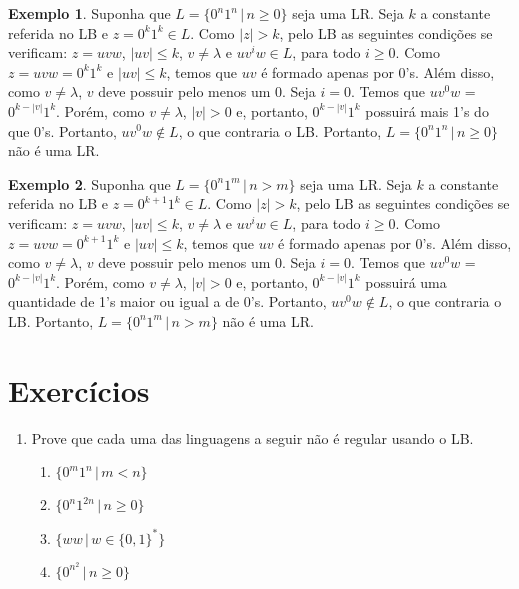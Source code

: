 \documentclass[a4paper]{article}
\theoremstyle{definition}
\newtheorem{Example}{Exemplo}
\begin{document}
  \begin{Example}
    Suponha que $L = \{0^n1^n\,|\,n\geq 0\}$ seja uma LR. Seja $k$ a constante
    referida no LB e $z = 0^k1^k \in L$. Como $|z| > k$, pelo LB as seguintes
    condições se verificam: $z = uvw$, $|uv| \leq k$, $v \neq \lambda$ e
    $uv^iw \in L$, para todo $i \geq 0$. Como $z = uvw = 0^k1^k$ e $|uv| \leq k$,
    temos que $uv$ é formado apenas por 0's. Além disso, como $v \neq \lambda$,
    $v$ deve possuir pelo menos um 0. Seja $i = 0$. Temos que $uv^0w$ = $0^{k -
      |v|}1^k$. Porém, como $v \neq \lambda$, $|v| > 0$ e, portanto,
    $0^{k -|v|}1^k$ possuirá mais 1's do que 0's. Portanto, $uv^0w \not\in L$, 
    o que contraria o LB. Portanto, $L = \{0^n1^n\,|\,n\geq 0\}$ não é uma LR.
  \end{Example}


  \begin{Example}
    Suponha que $L = \{0^n1^m\,|\,n > m\}$ seja uma LR. Seja $k$ a constante
    referida no LB e $z = 0^{k + 1}1^k \in L$. Como $|z| > k$, pelo LB as seguintes
    condições se verificam: $z = uvw$, $|uv| \leq k$, $v \neq \lambda$ e
    $uv^iw \in L$, para todo $i \geq 0$. Como $z = uvw = 0^{k+1}1^k$ e $|uv| \leq k$,
    temos que $uv$ é formado apenas por 0's. Além disso, como $v \neq \lambda$,
    $v$ deve possuir pelo menos um 0. Seja $i = 0$. Temos que $uv^0w$ = $0^{k -
      |v|}1^k$. Porém, como $v \neq \lambda$, $|v| > 0$ e, portanto,
    $0^{k -|v|}1^k$ possuirá uma quantidade de 1's maior ou igual a de 0's.
     Portanto, $uv^0w \not\in L$, 
     o que contraria o LB. Portanto, $L = \{0^n1^m\,|\,n > m\}$ não é uma LR.
  \end{Example}
  
  
  \section{Exercícios}

  \begin{enumerate}
    \item Prove que cada uma das linguagens a seguir não é regular usando o LB.
      \begin{enumerate}
        \item $\{0^m1^n\,|\,m < n\}$
        \item $\{0^n1^{2n}\,|\,n\geq 0\}$
        \item $\{ww\,|\,w\in\{0,1\}^*\}$
        \item $\{0^{n^2}\,|\,n\geq 0\}$
      \end{enumerate}
  \end{enumerate}
  
\end{document}
